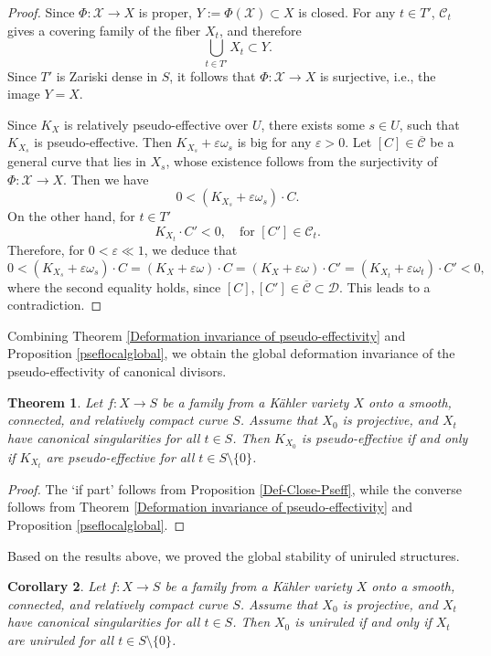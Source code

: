 \documentclass[12pt]{amsart}
\numberwithin{equation}{section}
\newtheorem{theorem} {Theorem} [section]
\newtheorem{corollary}  [theorem]     {Corollary}
\theoremstyle{definition}
\theoremstyle{plain}
\newtheorem*{thm A*}{Theorem A}
\newtheorem*{thm B*}{Theorem B}
\newtheorem*{thm C*}{Theorem C}
\newtheorem*{thm D*}{Theorem D}
\theoremstyle{definition}
\renewcommand{\1}{\mathds{1}}
\renewcommand{\>}{\rightarrow}
\begin{document}
\begin{proof}
Since
$\Phi \colon \mathcal{X} \to X$ is proper, $Y := \Phi(\mathcal{X}) \subset X$ is closed. For any $t \in T'$, $\mathcal{C}_t$ gives a covering family of the fiber $X_t$, and therefore
$$
\bigcup_{t \in T'} X_t \subset Y.
$$
Since $T'$ is Zariski dense in $S$,
it follows that $\Phi \colon \mathcal{X} \to X$ is surjective, i.e.,  the image $Y = X$.

Since $K_X$ is relatively pseudo-effective over $U$, there exists some $s \in U$, such that $K_{X_s}$ is pseudo-effective. Then $K_{X_s} + \varepsilon \omega_s$ is big for any $\varepsilon > 0$. Let $[C] \in \overline{\mathcal{C}}$ be a general curve that lies in $X_s$, whose existence follows from the surjectivity of $\Phi :\mathcal{X} \to X$. Then we have
\[
0 < (K_{X_s} + \varepsilon \omega_s) \cdot C.
\]
On the other hand, for $t \in T'$
\[
K_{X_t} \cdot C' < 0, \quad \text{for } [C'] \in \mathcal{C}_t.
\]
Therefore, for $0 < \varepsilon \ll 1$, we deduce that
\[
0 < (K_{X_s} + \varepsilon \omega_s) \cdot C = (K_X + \varepsilon \omega) \cdot C = (K_X + \varepsilon \omega) \cdot C' = (K_{X_t} + \varepsilon \omega_t) \cdot C' < 0,
\]
where the second equality holds, since $[C], [C'] \in \overline{\mathcal{C}} \subset \mathcal{D}$. This leads to a contradiction. 
\end{proof}
Combining Theorem \ref{Deformation invariance of pseudo-effectivity} and Proposition \ref{pseflocalglobal}, we obtain the global deformation invariance of the pseudo-effectivity of canonical divisors. 
\begin{theorem}\label{GlobalPseff}
Let $f: X \to S$ be a family from a K\"ahler variety $X$ onto a smooth, connected, and relatively compact curve $S$. Assume that $X_0$ is projective, and $X_t$ have canonical singularities for all $t\in S$. Then $K_{X_0}$ is pseudo-effective if and only if $K_{X_t} $ are pseudo-effective for all $t \in S \setminus \{0\}$.
\end{theorem}
\begin{proof}
The `if part' follows from Proposition \ref{Def-Close-Pseff}, while the converse follows from Theorem \ref{Deformation invariance of pseudo-effectivity} and Proposition \ref{pseflocalglobal}.
\end{proof}

Based on the results above, we proved the global stability of uniruled structures.

\begin{corollary}\label{DefUniruled}
Let $f: X \to S$ be a family from a K\"ahler variety $X$ onto a smooth, connected, and relatively compact curve $S$. Assume that $X_0$ is projective, and $X_t$ have canonical singularities for all $t\in S$. Then $X_0$ is uniruled if and only if $X_t$ are uniruled for all $t \in S \setminus \{0\}$.
\end{corollary}
\end{document}
